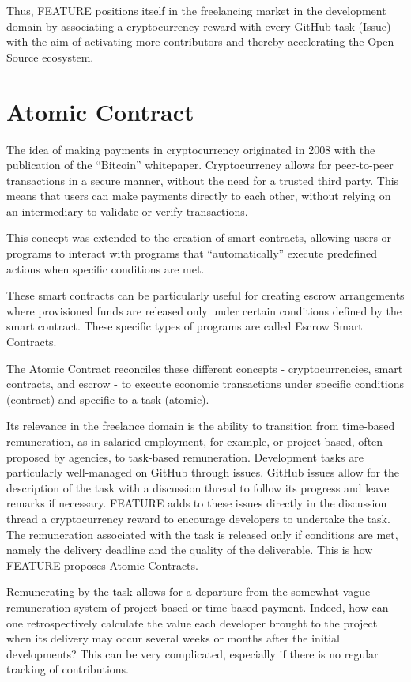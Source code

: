 \documentclass[
	a4paper, %
	10pt, %
	unnumberedsections, %
	twoside, %
]{LTJournalArticle}
\begin{document}
Thus, FEATURE positions itself in the freelancing market in the development domain by associating a cryptocurrency reward with every GitHub task (Issue) with the aim of activating more contributors and thereby accelerating the Open Source ecosystem.


\section{Atomic Contract}

The idea of making payments in cryptocurrency originated in 2008 with the publication of the ``Bitcoin'' whitepaper. Cryptocurrency allows for peer-to-peer transactions in a secure manner, without the need for a trusted third party. This means that users can make payments directly to each other, without relying on an intermediary to validate or verify transactions.

This concept was extended to the creation of smart contracts, allowing users or programs to interact with programs that ``automatically'' execute predefined actions when specific conditions are met.

These smart contracts can be particularly useful for creating escrow arrangements where provisioned funds are released only under certain conditions defined by the smart contract. These specific types of programs are called Escrow Smart Contracts.

The Atomic Contract reconciles these different concepts - cryptocurrencies, smart contracts, and escrow - to execute economic transactions under specific conditions (contract) and specific to a task (atomic).

Its relevance in the freelance domain is the ability to transition from time-based remuneration, as in salaried employment, for example, or project-based, often proposed by agencies, to task-based remuneration. Development tasks are particularly well-managed on GitHub through issues. GitHub issues allow for the description of the task with a discussion thread to follow its progress and leave remarks if necessary. FEATURE adds to these issues directly in the discussion thread a cryptocurrency reward to encourage developers to undertake the task. The remuneration associated with the task is released only if conditions are met, namely the delivery deadline and the quality of the deliverable. This is how FEATURE proposes Atomic Contracts.

Remunerating by the task allows for a departure from the somewhat vague remuneration system of project-based or time-based payment. Indeed, how can one retrospectively calculate the value each developer brought to the project when its delivery may occur several weeks or months after the initial developments? This can be very complicated, especially if there is no regular tracking of contributions.
\end{document}
